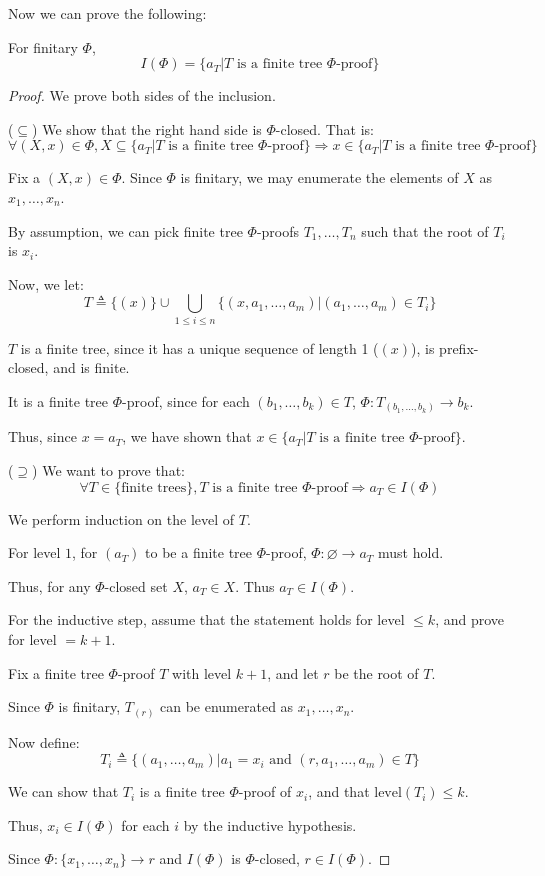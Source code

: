 \documentclass[12pt]{article}
\begin{document}
Now we can prove the following:
\begin{theorem}
	For finitary $\Phi$,
	\[I(\Phi)=\{a_T|T\text{ is a finite tree }\Phi\text{-proof}\}\]
\end{theorem}
\begin{proof}
	We prove both sides of the inclusion.

	\noindent($\subseteq$)
	We show that the right hand side is $\Phi$-closed. That is:
	\[\forall (X,x)\in\Phi,X\subseteq\{a_T|T\text{ is a finite tree }\Phi\text{-proof}\}\Rightarrow x\in\{a_T|T\text{ is a finite tree }\Phi\text{-proof}\}\]

	Fix a $(X,x)\in\Phi$. Since $\Phi$ is finitary, we may enumerate the elements of $X$ as $x_1,\dots,x_n$.

	By assumption, we can pick finite tree $\Phi$-proofs $T_1,\dots,T_n$ such that the root of $T_i$ is $x_i$.

	Now, we let:
	\[T\triangleq\{(x)\}\cup\bigcup_{1\le i\le n}\{(x,a_1,\dots,a_m)|(a_1,\dots,a_m)\in T_i\}\]

	$T$ is a finite tree, since it has a unique sequence of length 1 ($(x)$), is prefix-closed, and is finite.

	It is a finite tree $\Phi$-proof, since for each $(b_1,\dots,b_k)\in T$, $\Phi:T_{(b_1,\dots,b_k)}\rightarrow b_k$.

	Thus, since $x=a_T$, we have shown that $x\in\{a_T|T\text{ is a finite tree }\Phi\text{-proof}\}$.

	\noindent($\supseteq$)
	We want to prove that:
	\[\forall T\in\{\text{finite trees}\},T\text{ is a finite tree }\Phi\text{-proof}\Rightarrow a_T\in I(\Phi)\]

	We perform induction on the level of $T$.

	For level $1$, for $(a_T)$ to be a finite tree $\Phi$-proof, $\Phi:\varnothing\rightarrow a_T$ must hold.

	Thus, for any $\Phi$-closed set $X$, $a_T\in X$. Thus $a_T\in I(\Phi)$.

	For the inductive step, assume that the statement holds for level $\le k$, and prove for level $=k+1$.

	Fix a finite tree $\Phi$-proof $T$ with level $k+1$, and let $r$ be the root of $T$.

	Since $\Phi$ is finitary, $T_{(r)}$ can be enumerated as $x_1,\dots,x_n$.

	Now define:
	\[T_i\triangleq\{(a_1,\dots,a_m)|a_1=x_i\text{ and }(r,a_1,\dots,a_m)\in T\}\]

	We can show that $T_i$ is a finite tree $\Phi$-proof of $x_i$, and that $\text{level}(T_i)\le k$.

	Thus, $x_i\in I(\Phi)$ for each $i$ by the inductive hypothesis.

	Since $\Phi:\{x_1,\dots,x_n\}\rightarrow r$ and $I(\Phi)$ is $\Phi$-closed, $r\in I(\Phi)$.
\end{proof}
\clearpage
\end{document}
